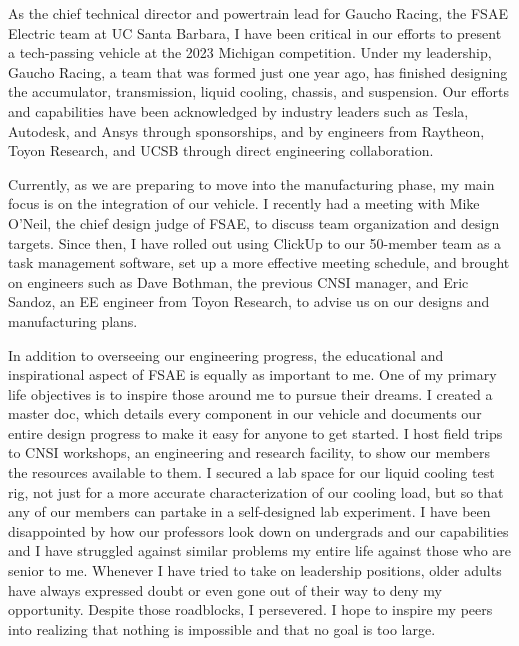 \documentclass[11pt, letterpaper]{awesome-cv} %
\begin{document}
\makecvheader %

\makelettertitle %


\begin{cvletter}

As the chief technical director and powertrain lead for Gaucho Racing, the FSAE Electric team at UC Santa Barbara, I have been critical in our efforts to present a tech-passing vehicle at the 2023 Michigan competition. Under my leadership, Gaucho Racing, a team that was formed just one year ago, has finished designing the accumulator, transmission, liquid cooling, chassis, and suspension. Our efforts and capabilities have been acknowledged by industry leaders such as Tesla, Autodesk, and Ansys through sponsorships, and by engineers from Raytheon, Toyon Research, and UCSB through direct engineering collaboration. 

Currently, as we are preparing to move into the manufacturing phase, my main focus is on the integration of our vehicle. I recently had a meeting with Mike O'Neil, the chief design judge of FSAE, to discuss team organization and design targets. Since then, I have rolled out using ClickUp to our 50-member team as a task management software, set up a more effective meeting schedule, and brought on engineers such as Dave Bothman, the previous CNSI manager, and Eric Sandoz, an EE engineer from Toyon Research, to advise us on our designs and manufacturing plans.

In addition to overseeing our engineering progress, the educational and inspirational aspect of FSAE is equally as important to me. One of my primary life objectives is to inspire those around me to pursue their dreams. I created a master doc, which details every component in our vehicle and documents our entire design progress to make it easy for anyone to get started. I host field trips to CNSI workshops, an engineering and research facility, to show our members the resources available to them. I secured a lab space for our liquid cooling test rig, not just for a more accurate characterization of our cooling load, but so that any of our members can partake in a self-designed lab experiment. I have been disappointed by how our professors look down on undergrads and our capabilities and I have struggled against similar problems my entire life against those who are senior to me. Whenever I have tried to take on leadership positions, older adults have always expressed doubt or even gone out of their way to deny my opportunity. Despite those roadblocks, I persevered. I hope to inspire my peers into realizing that nothing is impossible and that no goal is too large.



\end{cvletter}


\makeletterclosing %
\end{document}
